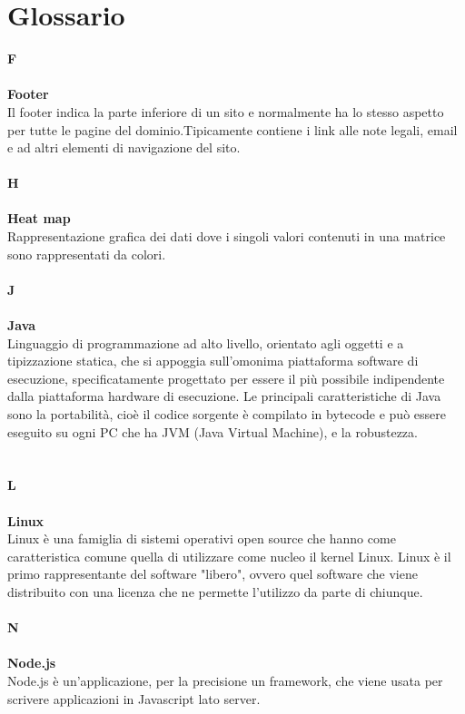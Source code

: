 \chapter{Glossario} \label{Glossario}
\textbf{F} \\
\\
\textbf{Footer} \\
Il footer indica la parte inferiore di un sito e normalmente ha lo stesso aspetto per tutte le pagine del dominio.Tipicamente contiene i link alle note legali, email  e ad altri elementi di navigazione del sito.
\\
\\
\textbf{H} \\
\\
\textbf{Heat map} \\
 Rappresentazione grafica dei dati dove i singoli valori contenuti in una matrice sono rappresentati da colori. \\
\\
\textbf{J} \\
\\
\textbf{Java} \\
Linguaggio di programmazione ad alto livello, orientato agli oggetti e a tipizzazione statica, che si appoggia sull'omonima piattaforma software di esecuzione, specificatamente progettato per essere il più possibile indipendente dalla piattaforma hardware di esecuzione. Le principali caratteristiche di Java sono la portabilità, cioè il codice sorgente
è compilato in bytecode e può essere eseguito su ogni PC che ha JVM (Java Virtual Machine), e la robustezza. \\
\\
\\
\textbf{L} \\
\\
\textbf{Linux} \\
Linux è una famiglia di sistemi operativi open source che hanno come caratteristica comune quella di utilizzare come nucleo il kernel Linux. Linux è il primo rappresentante del software "libero", ovvero quel software che viene distribuito con una licenza che ne permette l'utilizzo da parte di chiunque. \\
\\
\textbf{N}\\
\\
\textbf{Node.js} \\
Node.js è un’applicazione, per la precisione un framework, che viene usata per scrivere applicazioni in Javascript lato server. \\

